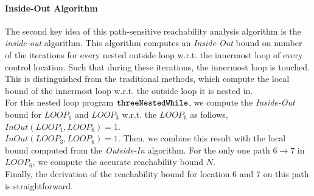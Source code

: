 \paragraph*{Inside-Out Algorithm}
The second key idea of this path-sensitive reachability analysis algorithm is the
\emph{inside-out} algorithm.
This algorithm computes an \emph{Inside-Out} bound on number of the iterations for
every nested outside loop w.r.t. the innermost loop of every control location.
Such that during these iterations, the innermost loop is touched. 
This is distinguished from the traditional methods, which compute the local bound
of the innermost loop w.r.t. the outside loop it is nested in.
%
\\
For this nested loop program ${\mathtt{threeNestedWhile}}$, 
we compute the \emph{Inside-Out} bound for $LOOP_1$ and $LOOP_3$
w.r.t. the $LOOP_6$ as follows,
$InOut(LOOP_1, LOOP_6) = 1$.
\\
$InOut(LOOP_3, LOOP_6) = 1$.
Then, we combine this result with the local bound
computed from the \emph{Outside-In} algorithm.
For the only one path $6 \to 7$ in $LOOP_6$, 
we compute the accurate reachability bound $N$.
\\
Finally, the derivation of the reachability bound for location $6$ and $7$
on this path is straightforward.

